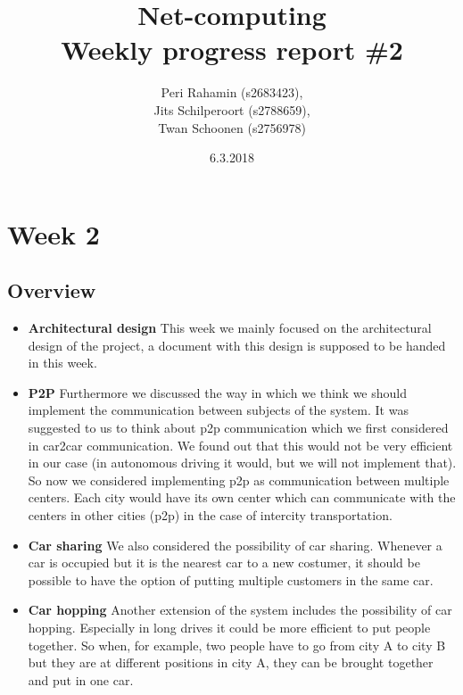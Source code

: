 \documentclass[a4paper]{article}
\begin{document}
\title{Net-computing\\
Weekly progress report \#2
}

\date{6.3.2018}

\author{Peri Rahamin (s2683423),\\
Jits Schilperoort (s2788659),\\
Twan Schoonen (s2756978)
}


\maketitle
\section*{Week 2}
\subsection*{Overview}
\begin{itemize}
	\item \textbf{Architectural design} This week we mainly focused on the architectural design of the project, a document with this design is supposed to be handed in this week.
	\item \textbf{P2P}  Furthermore we discussed the way in which we think we should implement the communication between subjects of the system. It was suggested to us to think about p2p communication which we first considered in car2car communication. We found out that this would not be very efficient in our case (in autonomous driving it would, but we will not implement that). So now we considered implementing p2p as communication between multiple centers. Each city would have its own center which can communicate with the centers in other cities (p2p) in the case of intercity transportation.  
	\item \textbf{Car sharing} We also considered the possibility of car sharing. Whenever a car is occupied but it is the nearest car to a new costumer, it should be possible to have the option of putting multiple customers in the same car. 
	\item \textbf{Car hopping} Another extension of the system includes the possibility of car hopping. Especially in long drives it could be more efficient to put people together. So when, for example, two people have to go from city A to city B but they are at different positions in city A, they can be brought together and put in one car.
\end{itemize}
\end{document}
